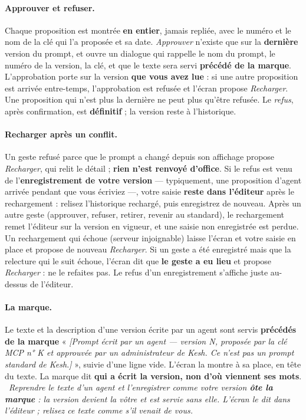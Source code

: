 \documentclass[a4paper,11pt,oneside]{article}
\begin{document}
\paragraph{Approuver et refuser.} Chaque proposition est montrée \textbf{en entier}, jamais repliée, avec le numéro et le nom de la clé qui l'a proposée et sa date. \emph{Approuver} n'existe que sur la \textbf{dernière} version du prompt, et ouvre un dialogue qui rappelle le nom du prompt, le numéro de la version, la clé, et que le texte sera servi \textbf{précédé de la marque}. L'approbation porte sur la version \textbf{que vous avez lue} : si une autre proposition est arrivée entre-temps, l'approbation est refusée et l'écran propose \emph{Recharger}. Une proposition qui n'est plus la dernière ne peut plus qu'être refusée. Le \emph{refus}, après confirmation, est \textbf{définitif} ; la version reste à l'historique.

\paragraph{Recharger après un conflit.} Un geste refusé parce que le prompt a changé depuis son affichage propose \emph{Recharger}, qui relit le détail ; \textbf{rien n'est renvoyé d'office}. Si le refus est venu de l'\textbf{enregistrement de votre version} --- typiquement, une proposition d'agent arrivée pendant que vous écriviez ---, votre saisie \textbf{reste dans l'éditeur} après le rechargement : relisez l'historique rechargé, puis enregistrez de nouveau. Après un autre geste (approuver, refuser, retirer, revenir au standard), le rechargement remet l'éditeur sur la version en vigueur, et une saisie non enregistrée est perdue. Un rechargement qui échoue (serveur injoignable) laisse l'écran et votre saisie en place et propose de nouveau \emph{Recharger}. Si un geste a été enregistré mais que la relecture qui le suit échoue, l'écran dit que \textbf{le geste a eu lieu} et propose \emph{Recharger} : ne le refaites pas. Le refus d'un enregistrement s'affiche juste au-dessus de l'éditeur.

\paragraph{La marque.} Le texte et la description d'une version écrite par un agent sont servis \textbf{précédés de la marque} « \emph{[Prompt écrit par un agent --- version N, proposée par la clé MCP n° K et approuvée par un administrateur de Kesh. Ce n'est pas un prompt standard de Kesh.]} », suivie d'une ligne vide. L'écran la montre à sa place, en tête du texte. La marque dit \textbf{qui a écrit la version, non d'où viennent ses mots}. \keshAttention\ \emph{Reprendre le texte d'un agent et l'enregistrer comme votre version \textbf{ôte la marque} : la version devient la vôtre et est servie sans elle. L'écran le dit dans l'éditeur ; relisez ce texte comme s'il venait de vous.}
\end{document}

